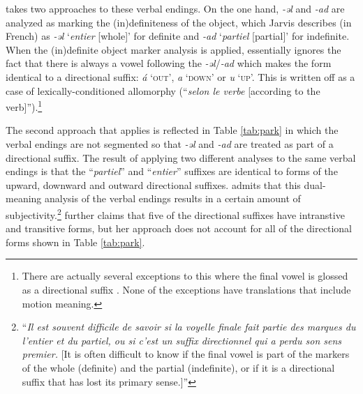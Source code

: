 \citet[89, 92]{jarvisEsquisseGrammaticalePodoko1989} takes two approaches to these verbal endings. On the one hand, \textit{-əl} and \textit{-ad} are analyzed as marking the (in)definiteness of the object, which Jarvis describes (in French) as \textit{-əl} `\textit{entier} [whole]' for definite and \textit{-ad} `\textit{partiel} [partial]' for indefinite. When the (in)definite object marker analysis is applied, \citet[92]{jarvisEsquisseGrammaticalePodoko1989} essentially ignores the fact that there is always a vowel following the \textit{-əl}/\textit{-ad} which makes the form identical to a directional suffix: \textit{á} `\textsc{out}', \textit{a} `\textsc{down}' or \textit{u} `\textsc{up}'. This is written off as a case of lexically-conditioned allomorphy (``\textit{selon le verbe} [according to the verb]'').\footnote{There are actually several exceptions to this where the final vowel is glossed as a directional suffix \citep[94, 96, 117]{jarvisEsquisseGrammaticalePodoko1989}. None of the exceptions have translations that include motion meaning.} 

The second approach that \citet[92]{jarvisEsquisseGrammaticalePodoko1989} applies is reflected in Table \ref{tab:park} in which the verbal endings are not segmented so that \textit{-əl} and \textit{-ad} are treated as part of a directional suffix. The result of applying two different analyses to the same verbal endings is that the ``\textit{partiel}'' and ``\textit{entier}'' suffixes are identical to forms of the upward, downward and outward directional suffixes. \citet[89]{jarvisEsquisseGrammaticalePodoko1989} admits that this dual-meaning analysis of the verbal endings results in a certain amount of subjectivity.\footnote{{}``\textit{Il est souvent difficile de savoir si la voyelle finale fait partie des marques du l'entier et du partiel, ou si c'est un suffix directionnel qui a perdu son sens premier.} [It is often difficult to know if the final vowel is part of the markers of the whole (definite) and the partial (indefinite), or if it is a directional suffix that has lost its primary sense.]'' } \citet[92]{jarvisEsquisseGrammaticalePodoko1989} further claims that five of the directional suffixes have intranstive and transitive forms, but her approach does not account for all of the directional forms shown in Table \ref{tab:park}. 

